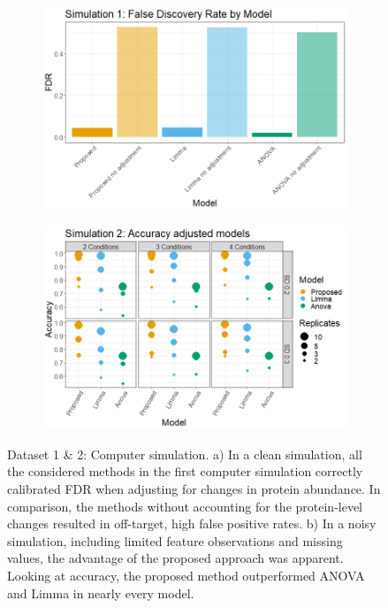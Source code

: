 \documentclass[mcp]{article}
\numberwithin{table}{section}
\begin{document}
\begin{figure}[ht]
\centering
\begin{subfigure}[c]{0.7\linewidth}
\includegraphics[width=1\textwidth]{images/sim1_FDR_all_models.png}
\caption{}
\label{fig:sim1_fdr}
\end{subfigure}
\begin{subfigure}[c]{0.825\linewidth}
\includegraphics[width=1\textwidth]{images/sim3_Accuracy.png}
\caption{}
\label{fig:sim2_acc}
\end{subfigure}
\caption{Dataset 1 \& 2: Computer simulation. a) In a clean simulation, all the considered methods in the first computer simulation correctly calibrated FDR when adjusting for changes in protein abundance. In comparison, the methods without accounting for the protein-level changes resulted in off-target, high false positive rates. b) In a noisy simulation, including limited feature observations and missing values, the advantage of the proposed approach was apparent. Looking at accuracy, the proposed method outperformed ANOVA and Limma in nearly every model.
}
\label{fig:computer_sim}
\end{figure}
\end{document}
